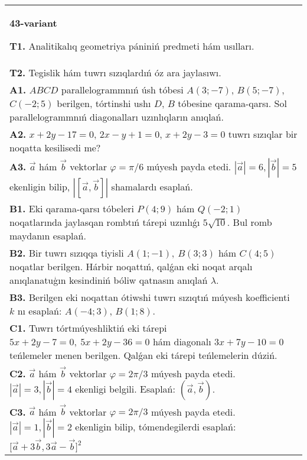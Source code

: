 \documentclass{article}
\begin{document}
\begin{tabular}{m{17cm}}
\textbf{43-variant}

\textbf{T1.} Analitikalıq geometriya pániniń predmeti hám usılları.
 \\
\textbf{T2.} 
Tegislik hám tuwrı sızıqlardıń óz ara jaylasıwı.
 \\
\textbf{A1.} 
$ABCD$ parallelogrammnıń úsh tóbesi $A (3; -7) $,
$B (5; -7) $, $C (-2; 5) $ berilgen, tórtinshi ushı $D$,
$B$ tóbesine qarama-qarsı. Sol parallelogrammnıń diagonalları
uzınlıqların anıqlań.
 \\
\textbf{A2.} 
$x+2y-17=0$, $2x-y+1=0$, $x+2y-3=0$
tuwrı sızıqlar bir noqatta kesilisedi me?
 \\
\textbf{A3.} 
$\overrightarrow{a}$ hám $\overrightarrow{b}$ vektorlar
$\varphi = \pi/6$ múyesh payda etedi.
$|\overrightarrow{a}| = 6,|\overrightarrow{b}| = 5$ ekenligin bilip,
$\left| \left\lbrack \overrightarrow{a},\overrightarrow{b} \right\rbrack \right|$ shamalardı esaplań.
 \\
\textbf{B1.} 
Eki qarama-qarsı tóbeleri \(P (4;9) \) hám \(Q (-2; 1) \) noqatlarında jaylasqan rombtıń tárepi uzınlıǵı \(5\sqrt{10}\). Bul
romb maydanın esaplań.
 \\
\textbf{B2.} 
Bir tuwrı sızıqqa tiyisli \(A (1;-1),\ B (3;3) \) hám
\(C (4;5) \) noqatlar berilgen. Hárbir noqattıń, qalǵan eki noqat arqalı anıqlanatuģın kesindiniń bóliw qatnasın anıqlań $\lambda$.
 \\
\textbf{B3.} 
Berilgen eki noqattan ótiwshi tuwrı sızıqtıń múyesh
koefficienti $k$ nı esaplań: $A (-4;3) $, $B (1;8) $.
 \\
\textbf{C1.} 
Tuwrı tórtmúyeshliktiń eki tárepi
\(5x+2y-7=0,\ 5x+2y-36=0\) hám diagonalı
\(3x+7y-10=0\) teńlemeler menen berilgen. Qalǵan eki tárepi
teńlemelerin dúziń.
 \\
\textbf{C2.} 
$\vec{a}$ hám $\vec{b}$ vektorlar $\varphi = 2\pi/3$ múyesh payda etedi. $|\vec{a}| = 3,|\vec{b}| = 4$ ekenligi belgili. Esaplań:
$\left(\vec{a},\vec{b} \right) $.
 \\
\textbf{C3.} 
$\vec{a}$ hám $\vec{b}$ vektorlar $\varphi = 2\pi/3$ múyesh payda etedi. $|\vec{a}| = 1,|\vec{b}| = 2$ ekenligin bilip, tómendegilerdi esaplań:
$\lbrack\overrightarrow{a} + 3\overrightarrow{b},3\overrightarrow{a} - \overrightarrow{b}\rbrack^{2}$
 \\

\end{tabular}
\vspace{1cm}
\end{document}
